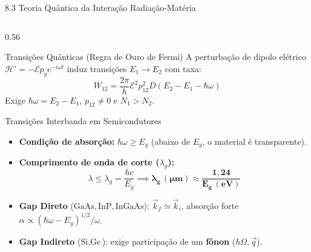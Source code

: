 \documentclass[aspectratio=169, 9pt]{beamer}
\begin{document}
\begin{frame}[shrink=7]{8.3 Teoria Quântica da Interação Radiação-Matéria}
  \begin{columns}[T, onlytextwidth]
    \begin{column}{0.56\textwidth}
      \begin{block}{Transições Quânticas (Regra de Ouro de Fermi)}
        A perturbação de dipolo elétrico $\mathcal{H}' = -\mathcal{E}p_y e^{-i\omega t}$ induz transições $E_1 \to E_2$ com taxa:
        \[
          W_{12} = \frac{2\pi}{\hbar}\mathcal{E}^2 p_{12}^2 D(E_2 - E_1 - \hbar\omega)
        \]
        Exige $\hbar\omega = E_2 - E_1$, $p_{12} \neq 0$ e $N_1 > N_2$.
      \end{block}
      \vspace{-0.15cm}
      \begin{alertblock}{Transições Interbanda em Semicondutores}
        \begin{itemize}
          \item \textbf{Condição de absorção:} $\hbar\omega \ge E_g$ (abaixo de $E_g$, o material é transparente).
          \item \textbf{Comprimento de onda de corte ($\lambda_g$):}
          \[
            \lambda \le \lambda_g = \frac{hc}{E_g} \implies \mathbf{\lambda_g\,(\mu\text{m}) \approx \frac{1{,}24}{E_g\,(\text{eV})}}
          \]
          \item \textbf{Gap Direto} ($\text{GaAs}, \text{InP}, \text{InGaAs}$): $\vec{k}_f \simeq \vec{k}_i$, absorção forte $\alpha \propto (\hbar\omega - E_g)^{1/2}/\omega$.
          \item \textbf{Gap Indireto} ($\text{Si}, \text{Ge}$): exige participação de um \textbf{fônon} ($\hbar\Omega, \vec{q}$).
        \end{itemize}
      \end{alertblock}
    \end{column}


\end{columns}
\end{frame}
\end{document}
